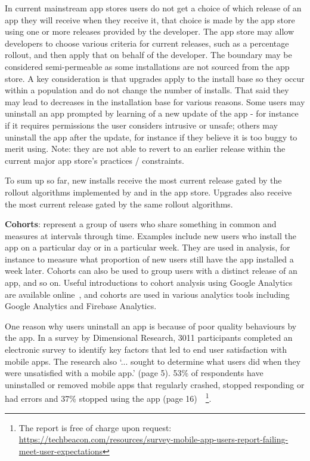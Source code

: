 In current mainstream app stores users do not get a choice of which release of an app they will receive when they receive it, that choice is made by the app store using one or more releases provided by the developer. The app store may allow developers to choose various criteria for current releases, such as a percentage rollout, and then apply that on behalf of the developer. The boundary may be considered semi-permeable as some installations are not sourced from the app store. A key consideration is that upgrades apply to the install base so they occur within a population and do not change the number of installs. That said they may lead to decreases in the installation base for various reasons. Some users may uninstall an app prompted by learning of a new update of the app - for instance if it requires permissions the user considers intrusive or unsafe; others may uninstall the app after the update, for instance if they believe it is too buggy to merit using. Note: they are not able to revert to an earlier release within the current major app store's practices / constraints. 

To sum up so far, new installs receive the most current release gated by the rollout algorithms implemented by and in the app store. Upgrades also receive the most current release gated by the same rollout algorithms.

\textbf{Cohorts}: represent a group of users who share something in common and measures at intervals through time. Examples include new users who install the app on a particular day or in a particular week. They are used in analysis, for instance to measure what proportion of new users still have the app installed a week later. Cohorts can also be used to group users with a distinct release of an app, and so on. Useful introductions to cohort analysis using Google Analytics are available online~\citep{codehouse2020_cohort_analysis, googleanalytics2021_the_cohort_analysis_report}, and cohorts are used in various analytics tools including Google Analytics and Firebase Analytics. 


One reason why users uninstall an app is because of poor quality behaviours by the app. In a survey by Dimensional Research, 3011 participants completed an electronic survey to identify key factors that led to end user satisfaction with mobile apps. The research also `... sought to determine what users did when they were unsatisfied with a mobile app.' (page 5). 
53\% of respondents have uninstalled or removed mobile apps that regularly crashed, stopped responding or had errors and 37\% stopped using the app (page 16)~\citep{dimensionalresearch2015_mobile_app_use_and_abandonment}~\footnote{The report is free of charge upon request: \url{https://techbeacon.com/resources/survey-mobile-app-users-report-failing-meet-user-expectations}}.

